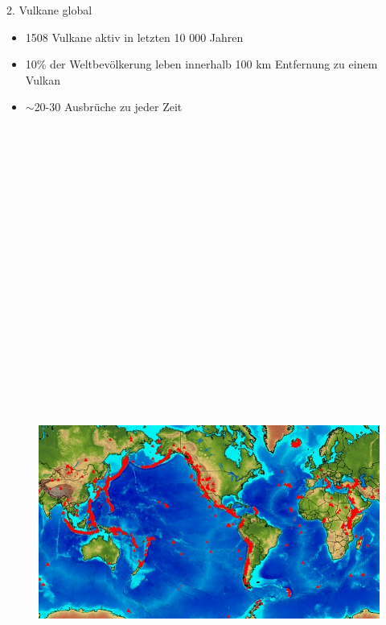 \documentclass[xcolor=dvipsnames]{beamer}
\begin{document}
\begin{frame}[t]{}
  \begin{minipage}[t]{0.385\textwidth}
  	\begin{block}{\LARGE 2. Vulkane global}
  \begin{itemize}
  \LARGE
  	\item 1508 Vulkane aktiv in letzten 10 000 Jahren 
	\item 10\% der Weltbevölkerung leben innerhalb 100 km Entfernung zu einem Vulkan
	\item $\sim$20-30 Ausbrüche zu jeder Zeit
  \end{itemize}
  \vskip 5mm
  \begin{figure}
  \includegraphics[trim=1cm 0cm 0cm 0cm, clip,height=26cm, width=32cm, angle=0]{images/4.jpg}

\end{figure}
\end{block}
\end{minipage}
\end{frame}
\end{document}
